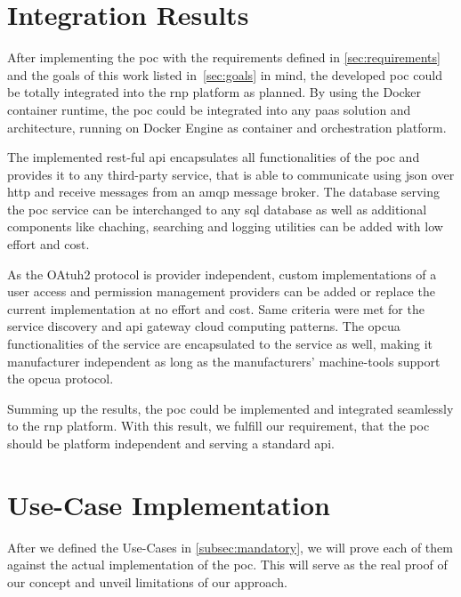 \documentclass[
a4paper,
twoside,
headsepline,
cleardoublepage=empty,
parskip=half,
draft=false
]{scrbook}
\begin{document}
		\section{Integration Results}\label{sec:integration_results}

			After implementing the \gls{poc} with the requirements defined in \cref{sec:requirements} and the goals of this work listed in~\cref{sec:goals} in mind, the developed \gls{poc} could be totally integrated into the \gls{rnp} platform as planned. By using the Docker container runtime, the \gls{poc} could be integrated into any \gls{paas} solution and architecture, running on Docker Engine as container and orchestration platform.

			The implemented \gls{rest}-ful \gls{api} encapsulates all functionalities of the \gls{poc} and provides it to any third-party service, that is able to communicate using \gls{json} over \gls{http} and receive messages from an \gls{amqp} message broker. The database serving the \gls{poc} service can be interchanged to any \gls{sql} database as well as additional components like chaching, searching and logging utilities can be added with low effort and cost.

			As the OAtuh2 protocol is provider independent, custom implementations of a user access and permission management providers can be added or replace the current implementation at no effort and cost. Same criteria were met for the service discovery and \gls{api} gateway cloud computing patterns.
			The \gls{opcua} functionalities of the service are encapsulated to the service as well, making it manufacturer independent as long as the manufacturers' machine-tools support the \gls{opcua} protocol.

			Summing up the results, the \gls{poc} could be implemented and integrated seamlessly to the \gls{rnp} platform. With this result, we fulfill our requirement, that the \gls{poc} should be platform independent and serving a standard \gls{api}.

		\section{Use-Case Implementation}\label{sec:use_cases_implementation}

			After we defined the Use-Cases in \cref{subsec:mandatory}, we will prove each of them against the actual implementation of the \gls{poc}. This will serve as the real proof of our concept and unveil limitations of our approach.
\end{document}
